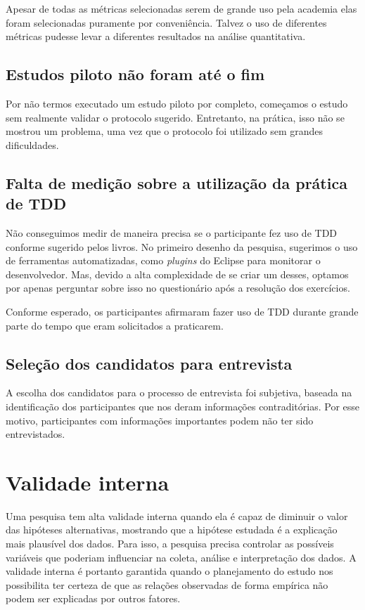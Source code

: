 Apesar de todas as métricas selecionadas serem de grande uso pela academia
elas foram selecionadas puramente por
conveniência. Talvez o uso de diferentes métricas pudesse levar a diferentes
resultados na análise quantitativa.

\subsection{Estudos piloto não foram até o fim}

Por não termos executado um estudo piloto por completo, começamos o estudo sem
realmente validar o protocolo sugerido. Entretanto, na prática, isso não se
mostrou um problema, uma vez que o protocolo foi utilizado sem grandes
dificuldades.

\subsection{Falta de medição sobre a utilização da prática de TDD}

Não conseguimos medir de maneira precisa se o participante fez uso de TDD
conforme sugerido pelos livros. No primeiro desenho da pesquisa, sugerimos o uso
de ferramentas automatizadas, como \textit{plugins} do Eclipse para monitorar o
desenvolvedor. Mas, devido a alta complexidade de se criar um desses, optamos
por apenas perguntar sobre isso no questionário após a resolução dos exercícios.

Conforme esperado, os participantes afirmaram fazer uso de TDD durante grande
parte do tempo que eram solicitados a praticarem.

\subsection{Seleção dos candidatos para entrevista}

A escolha dos candidatos para o processo de entrevista foi subjetiva, baseada
na identificação dos participantes que nos deram informações contraditórias.
Por esse motivo, participantes com informações importantes podem não ter sido
entrevistados.

\section{Validade interna}

Uma pesquisa tem alta validade interna quando ela é capaz de diminuir o valor das hipóteses alternativas, mostrando
que a hipótese estudada é a explicação mais plausível dos dados. Para isso, a pesquisa precisa controlar as possíveis
variáveis que poderiam influenciar na coleta, análise e interpretação dos dados. A validade interna é portanto
garantida quando o planejamento do estudo nos possibilita ter certeza de que as relações observadas de
forma empírica não podem ser explicadas por outros fatores.

